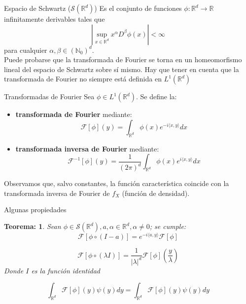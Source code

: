\documentclass{beamer}
\newcommand{\R}{\mathbb{R}}
\newcommand{\Rd}{\R^{d}}
\newcommand{\Sr}{\mathcal{S}(\mathbb{R}^{d})}
\newcommand{\F}{\mathcal{F}}
\newcommand{\N}{\mathbb{N}}
\newtheorem{teo}{Teorema:}
\begin{document}
\begin{frame}{Espacio de Schwartz ($\Sr$)}
	Es el conjunto de funciones $\phi: \Rd \rightarrow \R$ infinitamente derivables tales que $$ |\sup _{x\in \Rd}   x^{\alpha} D^{\beta} \phi (x)| < \infty $$
	para cualquier $\alpha, \beta \in (\N _{0})^{d}$.\\
	
	Puede probarse que la transformada de Fourier se torna en un homeomorfismo lineal del espacio de Schwartz sobre sí mismo. 
	Hay que tener en cuenta que la transformada de Fourier no siempre está definida en $L^{1}(\Rd) $
\end{frame}

\begin{frame}{Transformadas de Fourier}
	Sea $\phi \in L^{1}(\Rd)$. Se define la: 
	\begin{itemize}
		\item \textbf{transformada de Fourier} mediante:
		$$ \F[\phi](y)= \int_{\Rd} \phi (x) e ^{-i \langle x, y \rangle} dx  $$
		
		\item \textbf{transformada inversa de Fourier} mediante:
		$$ \F^{-1}[\phi](y) = \frac{1}{(2 \pi )^{d}} \int_{\Rd} \phi (x) e ^{i \langle x, y \rangle} dx  $$
	\end{itemize}

Observamos que, salvo constantes, la función característica coincide con la transformada inversa de Fourier de $f_{X}$ (función de densidad). 
\end{frame}

\begin{frame}{Algunas propiedades}
	\begin{teo}
		Sean $\phi \in \Sr, a, \alpha \in \Rd, \alpha \neq 0 $; se cumple:
		\begin{equation} \label{c}
		\F[ \phi \circ (I-a) ] = e^{-i \langle a ,y \rangle} \F [\phi]
		\end{equation}
		
		\begin{equation} \label{e}
		\F [ \phi \circ (\lambda I ) ] = \frac{1}{|\lambda|^{d}} \F [\phi] \left( \frac{y}{\lambda} \right)
		\end{equation}
		Donde $I$ es la función identidad
		
		\begin{equation} \label{f}
		\int_{\R^{d}} \F[\phi ](y) \psi(y) dy =  \int_{\R^{d}} \F[\phi ](y) \psi (y) dy 
		\end{equation}
		
	\end{teo}
\end{frame}
\end{document}

